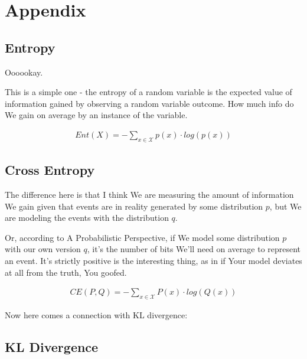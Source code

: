 \documentclass{article}
\begin{document}
		
		
		
		
		
		
		
		
		
		
		
		
		
		
		
		
		
		
		

\newpage\phantom{a}
\newpage		
\section{Appendix}

	\subsection{Entropy}
	
		Oooookay.
		
		This is a simple one - the entropy of a random variable is the expected value of information gained by observing a random variable outcome. How much info do We gain on average by an instance of the variable.
		
		\begin{align}
			Ent(X) = -\sum_{x\in\mathcal{X}} p(x)\cdot log(p(x))
		\end{align}
		
	\subsection{Cross Entropy}
	
		The difference here is that I think We are measuring the amount of information We gain given that events are in reality generated by some distribution $p$, but We are modeling the events with the distribution $q$.
		
		Or, according to A Probabilistic Perspective, if We model some distribution $p$ with our own version $q$, it's the number of bits We'll need on average to represent an event. It's strictly positive is the interesting thing, as in if Your model deviates at all from the truth, You goofed.
		
		\begin{align}
			CE(P, Q) = -\sum_{x\in\mathcal{X}} P(x)\cdot log(Q(x))
		\end{align}
		
		Now here comes a connection with KL divergence:
		
	\subsection{KL Divergence}
	
\end{document}
